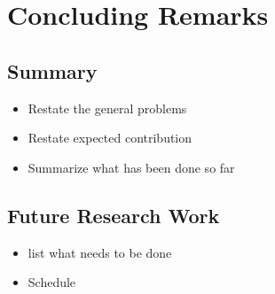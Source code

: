 

\chapter{Concluding Remarks}

	\section{Summary}

		\begin{itemize}
			\item Restate the general problems
			\item Restate expected contribution
			\item Summarize what has been done so far
		\end{itemize}


	\section{Future Research Work}

		\begin{itemize}
			\item list what needs to be done
			\item Schedule
		\end{itemize}